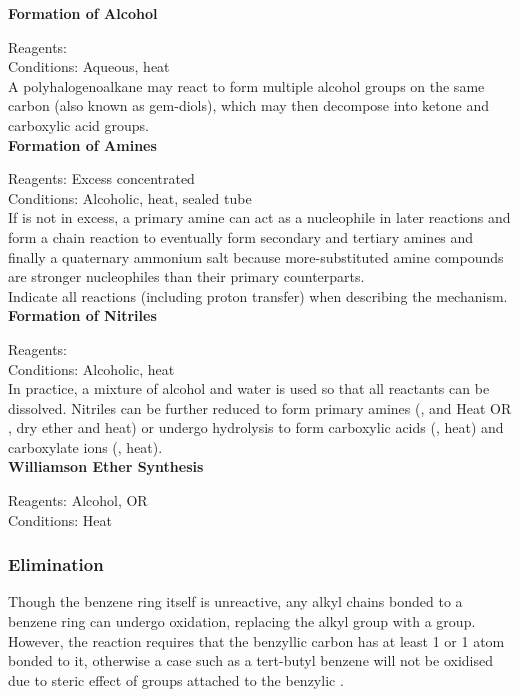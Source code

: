 \documentclass[../main]{subfiles}
\begin{document}
	\noindent \textbf{Formation of Alcohol}

	Reagents:  \\
	Conditions: Aqueous, heat \\

	A polyhalogenoalkane may react to form multiple alcohol groups on the same carbon (also known as gem-diols), which may then decompose into ketone and carboxylic acid groups. \\

	\noindent \textbf{Formation of Amines}

	Reagents: Excess concentrated  \\
	Conditions: Alcoholic, heat, sealed tube \\

	If  is not in excess, a primary amine can act as a nucleophile in later reactions and form a chain reaction to eventually form secondary and tertiary amines and finally a quaternary ammonium salt because more-substituted amine compounds are stronger nucleophiles than their primary counterparts. \\

	Indicate all reactions (including proton transfer) when describing the mechanism. \\

	\noindent \textbf{Formation of Nitriles}

	Reagents:  \\
	Conditions: Alcoholic, heat \\

	In practice, a mixture of alcohol and water is used so that all reactants can be dissolved. Nitriles can be further reduced to form primary amines (,  and Heat OR , dry ether and heat) or undergo hydrolysis to form carboxylic acids (, heat) and carboxylate ions (, heat). \\

	\noindent \textbf{Williamson Ether Synthesis}

	Reagents: Alcohol,  OR \\
	Conditions: Heat \\

	\subsubsection{Elimination}

	Though the benzene ring itself is unreactive, any alkyl chains bonded to a benzene ring can undergo oxidation, replacing the alkyl group with a  group. However, the reaction requires that the benzyllic carbon has at least 1  or 1  atom bonded to it, otherwise a case such as a tert-butyl benzene will not be oxidised due to steric effect of  groups attached to the benzylic . \\
\end{document}
